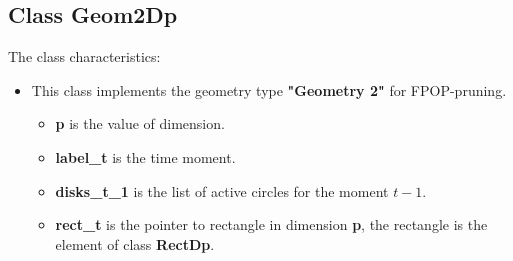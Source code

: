 \documentclass{report}
\begin{document}
	\subsection*{Class Geom2Dp}
	\label{Geom2Dp}
	
	The class characteristics: 
	\begin{itemize}
		\item This class implements the geometry type {\bfseries "Geometry 2"} for FPOP-pruning. 
		\begin{itemize}
			\item {\bfseries p} is the value of dimension.
			\item {\bfseries label\_t} is the time moment.
			\item {\bfseries disks\_t\_1} is the list of active circles for the moment $t-1$.
			\item {\bfseries rect\_t} is the pointer to rectangle in dimension {\bfseries p}, the rectangle is the element of class {\bfseries RectDp}.
		\end{itemize}
	\end{itemize}
\end{document}
